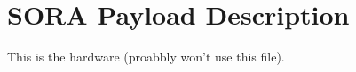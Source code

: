 \section{SORA Payload Description}
\label{sec:Hardware}

This is the hardware (proabbly won't use this file).
